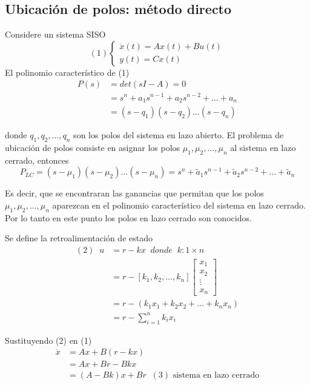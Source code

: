 \subsection{Ubicación de polos: método directo}
Considere un sistema SISO
\[(1)
    \left\{
        \begin{array}{lll}
            \dot{x}(t) = Ax(t) + Bu(t) \\
            y(t) = Cx(t)
        \end{array}
    \right.
\]
El polinomio característico de (1)
\[
    \begin{split}
        P(s) & = det(sI-A) = 0\\
        & = s^{n} + a_{1}s^{n-1} + a_{2}s^{n-2} + \ldots + a_{n}\\
        & = (s-q_{1}) (s-q_{2}) \ldots (s-q_{n})
    \end{split}
\]

donde \( q_{1}, q_{2}, \ldots, q_{n} \) son los polos del sistema en lazo abierto.
El problema de ubicación de polos consiste en asignar los polos \( \mu_{1}, \mu_{2}, \ldots, \mu_{n} \) al sistema en lazo cerrado, entonces
\[
    P_{LC} = (s-\mu_{1}) (s-\mu_{2}) \ldots (s-\mu_{n}) = s^{n} + \tilde{a}_{1}s^{n-1} + \tilde{a}_{2}s^{n-2} + \ldots + \tilde{a}_{n}
\]

Es decir, que se encontraran las ganancias que permitan que los polos \( \mu_{1}, \mu_{2}, \ldots, \mu_{n} \) aparezcan en el polinomio característico del sistema en lazo cerrado. Por lo tanto en este punto los polos en lazo cerrado son conocidos.

Se define la retroalimentación de estado
\[
    \begin{split}
        (2) \;\; 
        u & = r - kx \;\; donde \;\; k:1 \times n \\
        & = r - [k_{1}, k_{2}, \ldots, k_{n}]
        \begin{bmatrix}
            x_{1} \\ x_{2}\\ \vdots \\ x_{n}
        \end{bmatrix} \\
        & = r - (k_{1}x_{1} + k_{2}x_{2} + \ldots + k_{n}x_{n}) \\
        & = r - \sum_{i=1}^{n} k_{i}x_{i}
    \end{split}
\]

Sustituyendo (2) en (1)
\[
    \begin{split}
        \dot{x} & = Ax + B(r-kx) \\
        & = Ax + Br -Bkx \\
        & = (A-Bk)x + Br \;\; (3) \text{ sistema en lazo cerrado}
    \end{split}
\]

